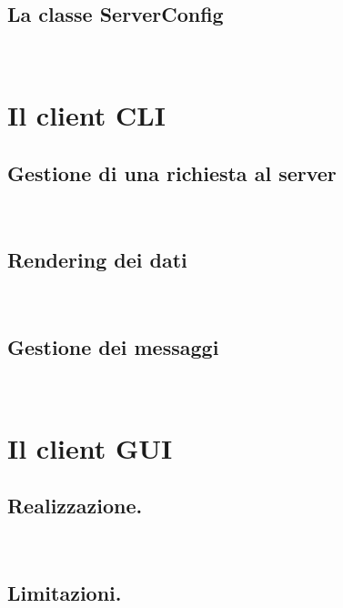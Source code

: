 \documentclass[a4paper,8pt]{article} %
\begin{document}
\subsection{La classe ServerConfig}\quad \\

\section{Il client CLI}

\subsection{Gestione di una richiesta al server}\quad \\
\subsection{Rendering dei dati}\quad \\
\subsection{Gestione dei messaggi}\quad \\

\section{Il client GUI}

\subsection{Realizzazione.}\quad \\
\subsection{Limitazioni.}\quad \\
\end{document}
